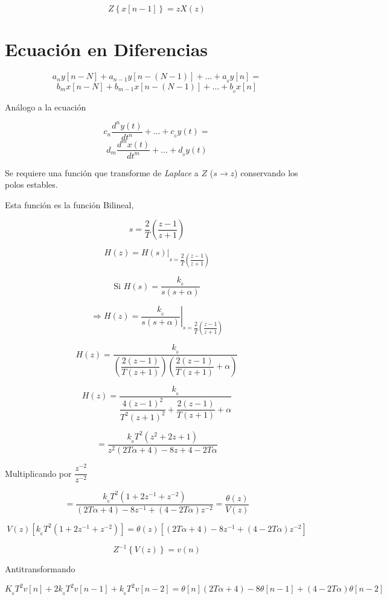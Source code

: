 $$Z\left\lbrace x[n - 1] \right\rbrace = zX(z)$$


\section{Ecuación en Diferencias}

$$a_{n}y[n - N] + a_{n - 1}y[n - (N - 1)] + \ldots + a_{_0}y[n] = $$
$$b_{m}x[n - N] + b_{m - 1}x[n - (N - 1)] + \ldots + b_{_0}x[n]$$
 
Análogo a la ecuación

$$c_{n} \dfrac{d^{n} y(t)}{dt^{n}} + \ldots + c_{_0}y(t) = $$
$$d_{m} \dfrac{d^{m} x(t)}{dt^{m}} + \ldots + d_{_0}y(t)$$


Se requiere una función que transforme de \textit{Laplace} a $Z$ ($s \rightarrow z$) conservando los polos estables.

Esta función es la función Bilineal,

$$s = \dfrac{2}{T} \left( \dfrac{z - 1}{z + 1} \right)$$

$$H(z) = \left. H(s) \right|_{s = \dfrac{2}{T} \left( \dfrac{z - 1}{z + 1} \right)}$$

$$\mbox{Si } H(s) = \dfrac{k_{_0}}{s(s + \alpha)}$$

$$\Rightarrow H(z) = \left. \dfrac{k_{_0}}{s(s + \alpha)} \right|_{s = \dfrac{2}{T} \left( \dfrac{z - 1}{z + 1} \right)}$$

$$H(z) = \dfrac{k_{_0}}{\left( \dfrac{2(z - 1)}{T(z + 1)} \right) \left( \dfrac{2(z - 1)}{T(z + 1)}  + \alpha \right)}$$

$$H(z) = \dfrac{k_{_0}}{\dfrac{4(z - 1)^{2}}{T^{2}(z + 1)^{2}} + \dfrac{2(z - 1)}{T(z + 1)} + \alpha}$$

$$= \dfrac{k_{_0}T^{2}(z^{2} + 2z + 1)}{z^{2}(2T\alpha + 4) - 8z + 4 -2T\alpha}$$

Multiplicando por $\dfrac{z^{-2}}{z^{-2}}$

$$= \dfrac{k_{_0}T^{2}(1 + 2z^{-1} + z^{-2})}{(2T\alpha + 4) - 8z^{-1} + (4 - 2T\alpha)z^{-2}} = \dfrac{\theta (z)}{V(z)}$$

$$V(z)\left[ k_{_0}T^{2}(1 + 2z^{-1} + z^{-2}) \right] = \theta(z) \left[ (2T\alpha + 4) - 8z^{-1} + (4 - 2T\alpha)z^{-2} \right]$$

$$Z^{-1} \left\lbrace  V(z) \right\rbrace = v(n)$$

Antitransformando

$$K_{_0}T^{2}v[n] + 2k_{_0}T^{2}v[n - 1] + k_{_0}T^{2}v[n -2] = \theta[n] (2T\alpha + 4) - 8\theta[n - 1] + (4 - 2T\alpha)\theta[n - 2]$$



